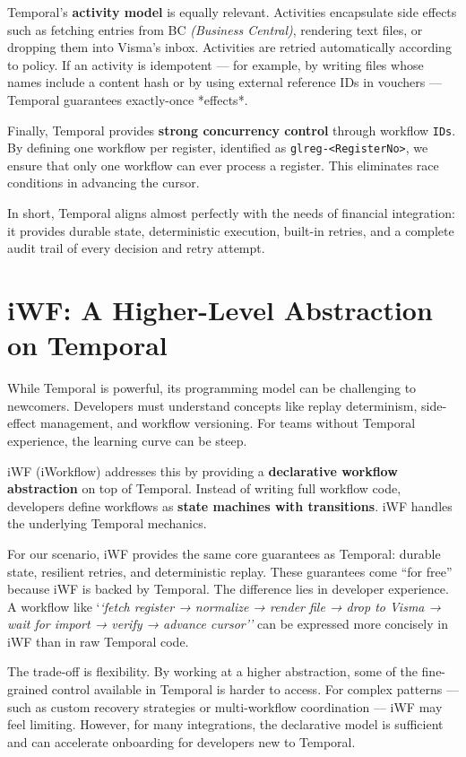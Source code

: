 \documentclass[11pt, a4paper, twocolumn]{article} %
\begin{document}
Temporal’s \textbf{activity model} is equally relevant. Activities encapsulate side effects such as fetching entries from BC \textit{(Business Central)}, rendering text files, or dropping them into Visma’s inbox. Activities are retried automatically according to policy. If an activity is idempotent — for example, by writing files whose names include a content hash or by using external reference IDs in vouchers — Temporal guarantees exactly-once *effects*.

Finally, Temporal provides \textbf{strong concurrency control} through workflow \texttt{IDs}. By defining one workflow per register, identified as \texttt{glreg-<RegisterNo>}, we ensure that only one workflow can ever process a register. This eliminates race conditions in advancing the cursor.

In short, Temporal aligns almost perfectly with the needs of financial integration: it provides durable state, deterministic execution, built-in retries, and a complete audit trail of every decision and retry attempt.

\section*{iWF: A Higher-Level Abstraction on Temporal}

While Temporal is powerful, its programming model can be challenging to newcomers. Developers must understand concepts like replay determinism, side-effect management, and workflow versioning. For teams without Temporal experience, the learning curve can be steep.

iWF (iWorkflow) addresses this by providing a \textbf{declarative workflow abstraction} on top of Temporal. Instead of writing full workflow code, developers define workflows as \textbf{state machines with transitions}. iWF handles the underlying Temporal mechanics.

For our scenario, iWF provides the same core guarantees as Temporal: durable state, resilient retries, and deterministic replay. These guarantees come ``for free'' because iWF is backed by Temporal. The difference lies in developer experience. A workflow like `\textit{`fetch register → normalize → render file → drop to Visma → wait for import → verify → advance cursor''} can be expressed more concisely in iWF than in raw Temporal code.

The trade-off is flexibility. By working at a higher abstraction, some of the fine-grained control available in Temporal is harder to access. For complex patterns — such as custom recovery strategies or multi-workflow coordination — iWF may feel limiting. However, for many integrations, the declarative model is sufficient and can accelerate onboarding for developers new to Temporal.
\end{document}
